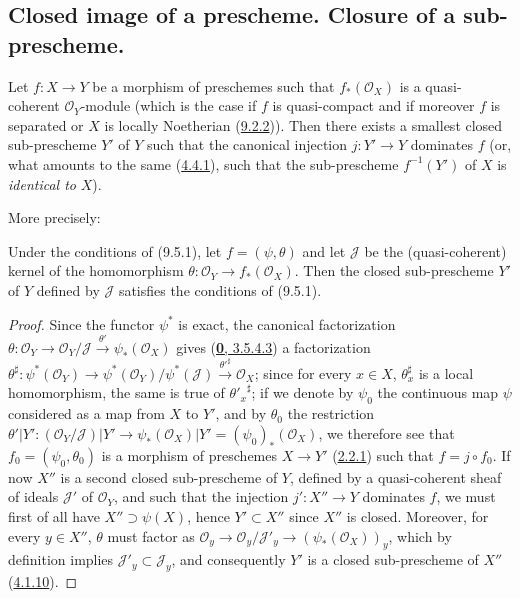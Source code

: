 \subsection{Closed image of a prescheme. Closure of a sub-prescheme.}
\label{subsection:I.9.5}

\begin{proposition}[9.5.1]
\label{I.9.5.1}
Let $f:X\to Y$ be a morphism of preschemes such that $f_*(\mathscr{O}_X)$ is
a quasi-coherent $\mathscr{O}_Y$-module (which is the case if $f$ is
quasi-compact and if moreover $f$ is separated or $X$ is locally Noetherian
\textup{(\hyperref[I.9.2.2]{9.2.2})}). Then there exists a smallest closed
sub-prescheme $Y'$ of $Y$ such that the canonical injection $j:Y'\to Y$
dominates $f$ \textup{(or, what amounts to the same \textup{(\hyperref[I.4.4.1]{4.4.1})},
such that the sub-prescheme $f^{-1}(Y')$ of $X$ is \emph{identical to} $X$)}.
\end{proposition}

More precisely:

\begin{corollary}[9.5.2]
\label{I.9.5.2}
Under the conditions of (9.5.1), let $f=(\psi,\theta)$ and let $\mathscr{J}$
be the (quasi-coherent) kernel of the homomorphism
$\theta:\mathscr{O}_Y\to f_*(\mathscr{O}_X)$. Then the closed sub-prescheme
$Y'$ of $Y$ defined by $\mathscr{J}$ satisfies the conditions of (9.5.1).
\end{corollary}

\begin{proof}
Since the functor $\psi^*$ is exact, the canonical factorization
$\theta:\mathscr{O}_Y\to\mathscr{O}_Y/\mathscr{J}
\xrightarrow{\theta'}\psi_*(\mathscr{O}_X)$ gives
(\hyperref[0.3.5.4.3]{\textbf{0}, 3.5.4.3}) a factorization $\theta^\sharp:\psi^*(\mathscr{O}_Y)
\to\psi^*(\mathscr{O}_Y)/\psi^*(\mathscr{J})
\xrightarrow{{\theta'}^\sharp}\mathscr{O}_X$;
since for every $x\in X$, $\theta_x^\sharp$ is a local homomorphism, the
same is true of ${\theta'_x}^\sharp$; if we denote by $\psi_0$ the
continuous map $\psi$ considered as a map from $X$ to $Y'$, and by
$\theta_0$ the restriction
$\theta'|Y':(\mathscr{O}_Y/\mathscr{J})|Y'
\to\psi_*(\mathscr{O}_X)|Y'=(\psi_0)_*(\mathscr{O}_X)$, we therefore see
that $f_0=(\psi_0,\theta_0)$ is a morphism of preschemes $X\to Y'$
(\hyperref[I.2.2.1]{2.2.1}) such that $f=j\circ f_0$. If now $X''$
is a second closed sub-prescheme of $Y$, defined by a quasi-coherent sheaf
of ideals $\mathscr{J}'$ of $\mathscr{O}_Y$, and such that the injection
$j':X''\to Y$ dominates $f$, we must first of all have
$X''\supset\psi(X)$, hence $Y'\subset X''$ since $X''$ is closed. Moreover,
for every $y\in X''$, $\theta$ must factor as
$\mathscr{O}_y\to\mathscr{O}_y/\mathscr{J}'_y
\to(\psi_*(\mathscr{O}_X))_y$, which by definition implies
$\mathscr{J}'_y\subset\mathscr{J}_y$, and consequently $Y'$ is a closed
sub-prescheme of $X''$ (\hyperref[I.4.1.10]{4.1.10}).
\end{proof}

